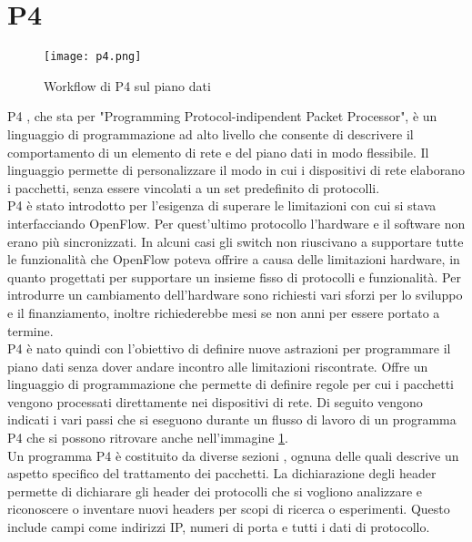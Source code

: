 \section{P4}
\begin{figure}[h]
    \centering
   \texttt{[image: p4.png]}
    \caption{Workflow di P4 sul piano dati}
    \label{fig:p4}
\end{figure}
P4 \cite{p4}, che sta per "Programming Protocol-indipendent Packet Processor",  è un linguaggio di programmazione ad alto livello che consente di descrivere il comportamento di un elemento di rete e del piano dati in modo flessibile.
Il linguaggio permette di personalizzare il modo in cui i dispositivi di rete elaborano i pacchetti, senza essere vincolati a un set predefinito di protocolli.
\\P4 è stato introdotto per l'esigenza di superare le limitazioni con cui si stava interfacciando OpenFlow.
Per quest'ultimo protocollo l'hardware e il software non erano più sincronizzati. In alcuni casi 
gli switch non riuscivano a supportare tutte le funzionalità che OpenFlow poteva offrire a causa delle limitazioni hardware, in quanto progettati per supportare un insieme fisso di protocolli e funzionalità. 
Per introdurre un cambiamento dell'hardware sono richiesti vari sforzi per lo sviluppo e il finanziamento, inoltre richiederebbe mesi se non anni per essere portato a termine.
\\P4 è nato quindi con l'obiettivo di definire nuove astrazioni per programmare il piano dati senza dover andare incontro alle limitazioni riscontrate.
Offre un linguaggio di programmazione che permette di definire regole per cui i pacchetti vengono processati direttamente nei dispositivi di rete.
Di seguito vengono indicati i vari passi che si eseguono durante un flusso di lavoro di un programma P4 che si possono ritrovare anche nell'immagine \ref{fig:p4}.
\\Un programma P4 è costituito da diverse sezioni \cite{p4Article}, ognuna delle quali descrive un aspetto specifico del trattamento dei pacchetti.
La dichiarazione degli header permette di dichiarare gli header dei protocolli che si vogliono analizzare e riconoscere o inventare nuovi headers per scopi di ricerca o esperimenti.
Questo include campi come indirizzi IP, numeri di porta e tutti i dati di protocollo.
